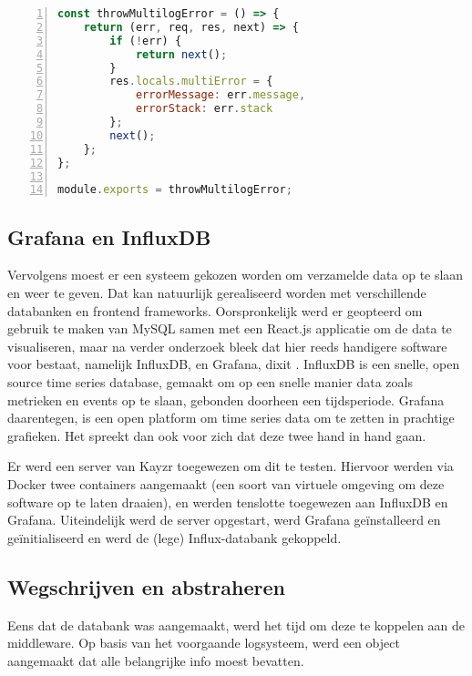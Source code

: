 \begin{lstlisting}[language=JavaScript, breaklines=true, numbers=left, frame=single, caption={MultiError.js, de custom error handler},label=code:multiError]
const throwMultilogError = () => {
	return (err, req, res, next) => {
		if (!err) {
			return next();
		}
		res.locals.multiError = {
			errorMessage: err.message,
			errorStack: err.stack
		};
		next();
	};
};

module.exports = throwMultilogError;
\end{lstlisting}

\subsection{Grafana en InfluxDB}
\label{sec:grafanaAndInflux}

Vervolgens moest er een systeem gekozen worden om verzamelde data op te slaan en weer te geven. Dat kan natuurlijk gerealiseerd worden met verschillende databanken en frontend frameworks. Oorspronkelijk werd er geopteerd om gebruik te maken van MySQL samen met een React.js applicatie om de data te visualiseren, maar na verder onderzoek bleek dat hier reeds handigere software voor bestaat, namelijk InfluxDB, en Grafana, dixit \textcite{Hill2015}. InfluxDB is een snelle, open source time series database, gemaakt om op een snelle manier data zoals metrieken en events op te slaan, gebonden doorheen een tijdsperiode. Grafana daarentegen, is een open platform om time series data om te zetten in prachtige grafieken. Het spreekt dan ook voor zich dat deze twee hand in hand gaan.

Er werd een server van Kayzr toegewezen om dit te testen. Hiervoor werden via Docker twee containers aangemaakt (een soort van virtuele omgeving om deze software op te laten draaien), en werden tenslotte toegewezen aan InfluxDB en Grafana. Uiteindelijk werd de server opgestart, werd Grafana geïnstalleerd en geïnitialiseerd en werd de (lege) Influx-databank gekoppeld. 

\subsection{Wegschrijven en abstraheren}
\label{sec:abstraction}
Eens dat de databank was aangemaakt, werd het tijd om deze te koppelen aan de middleware. Op basis van het voorgaande logsysteem, werd een object aangemaakt dat alle belangrijke info moest bevatten. 

